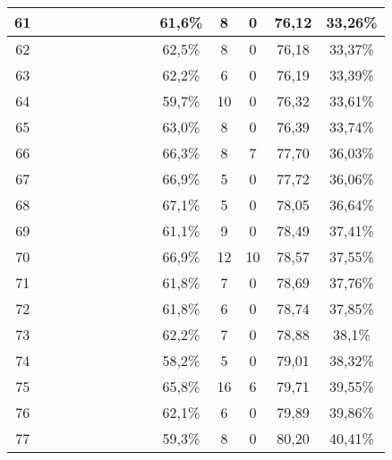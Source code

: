 \begin{longtable}{|c|c|c|c|c|c|c|c|c|c|c|c|c|c|}
61  &  \x    & \x    & \x    & \x    &       & \x\m  &       & \x\m  & 61,6\% &  8  & 0  & 76,12 & 33,26\% \\ \hline
62  &  \x    & \x    & \x    & \x    &       &       & \x\m  &       & 62,5\% &  8  & 0  & 76,18 & 33,37\% \\ \hline
63  &  \x    & \x    & \x    & \x    & \x    & \x\m  &       & \x\m  & 62,2\% &  6  & 0  & 76,19 & 33,39\% \\ \hline
64  &  \x    & \x    & \x    &       &       &       &       &       & 59,7\% &  10 & 0  & 76,32 & 33,61\% \\ \hline
65  &  \x    & \x    & \x    &       & \x    &       & \x\m  &       & 63,0\% &  8  & 0  & 76,39 & 33,74\% \\ \hline
66  &  \x    & \x    & \x    & \x    & \x\m  &       & \x\m  &       & 66,3\% &  8  & 7  & 77,70 & 36,03\% \\ \hline
67  &  \x    & \x    & \x    &       & \x\m  & \x    & \x    &       & 66,9\% &  5  & 0  & 77,72 & 36,06\% \\ \hline
68  &  \x    & \x    & \x    & \x    & \x\m  &       & \x    &       & 67,1\% &  5  & 0  & 78,05 & 36,64\% \\ \hline
69  &  \x    & \x    & \x    & \x    &       & \x\m  &       & \x    & 61,1\% &  9  & 0  & 78,49 & 37,41\% \\ \hline
70  &  \x    & \x    &       & \x    & \x\m  & \x\m  &       & \x\m  & 66,9\% &  12 & 10 & 78,57 & 37,55\% \\ \hline
71  &  \x    & \x    & \x    & \x    & \x    &       &       & \x    & 61,8\% &  7  & 0  & 78,69 & 37,76\% \\ \hline
72  &  \x    & \x    & \x    &       & \x    & \x\m  &       & \x\m  & 61,8\% &  6  & 0  & 78,74 & 37,85\% \\ \hline
73  &  \x    & \x    & \x    &       & \x    & \x\m  &       &       & 62,2\% &  7  & 0  & 78,88 & 38,1\% \\ \hline
74  &  \x    & \x    &       & \x    & \x    & \x    &       &       & 58,2\% &  5  & 0  & 79,01 & 38,32\% \\ \hline
75  &  \x    & \x    &       &       & \x\m  & \x\m  & \x\m  &       & 65,8\% &  16 & 6  & 79,71 & 39,55\% \\ \hline
76  &  \x    & \x    & \x    & \x    &       &       & \x    &       & 62,1\% &  6  & 0  & 79,89 & 39,86\% \\ \hline
77  &  \x    & \x    & \x    &       &       & \x\m  &       & \x\m  & 59,3\% &  8  & 0  & 80,20 & 40,41\% \\ \hline

\end{longtable}
